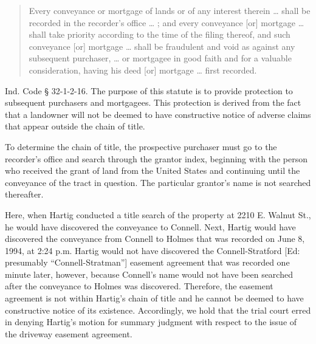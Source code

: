 \begin{quote}
Every conveyance or mortgage of lands or of any interest therein \dots{} shall
be recorded in the recorder's office \dots{} ; and every conveyance [or]
mortgage \dots{} shall take priority according to the time of the filing
thereof, and such conveyance [or] mortgage \dots{} shall be fraudulent and void
as against any subsequent purchaser, \dots{} or mortgagee in good faith and for
a valuable consideration, having his deed [or] mortgage \dots{} first recorded.
\end{quote}

Ind. Code {\S} 32-1-2-16. The purpose of this statute is to provide protection
to subsequent purchasers and mortgagees. This protection is derived from the
fact that a landowner will not be deemed to have constructive notice of adverse
claims that appear outside the chain of title.

To determine the chain of title, the prospective purchaser must go to the
recorder's office and search through the grantor index, beginning with the
person who received the grant of land from the United States and continuing
until the conveyance of the tract in question. The particular grantor's name is
not searched thereafter.

Here, when Hartig conducted a title search of the property at 2210 E. Walnut
St., he would have discovered the conveyance to Connell. Next, Hartig would
have discovered the conveyance from Connell to Holmes that was recorded on June
8, 1994, at 2:24 p.m. Hartig would not have discovered the Connell-Stratford
[Ed: presumably ``Connell-Stratman''] easement agreement that was recorded one
minute later, however, because Connell's name would not have been searched
after the conveyance to Holmes was discovered. Therefore, the easement
agreement is not within Hartig's chain of title and he cannot be deemed to have
constructive notice of its existence. Accordingly, we hold that the trial court
erred in denying Hartig's motion for summary judgment with respect to the issue
of the driveway easement agreement. 

